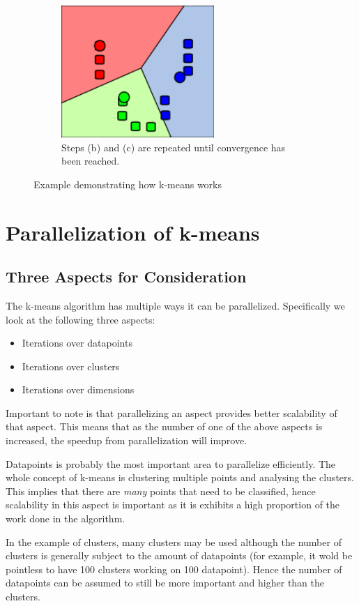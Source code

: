 \documentclass{article}
\begin{document}
\begin{figure}
    \begin{subfigure}{0.5\textwidth}
        \includegraphics[width=0.9\linewidth, height=5cm]{Pictures/K_Means_Example_Step_4.png}
        \caption{Steps (b) and (c) are repeated until convergence has been reached.}
    \end{subfigure}
\caption{Example demonstrating how k-means works}

\end{figure}



\section{Parallelization of k-means}
\subsection{Three Aspects for Consideration}
The k-means algorithm has multiple ways it can be parallelized. Specifically we look at the following three aspects:
\begin{itemize}
	\item Iterations over datapoints
	\item Iterations over clusters
	\item Iterations over dimensions
\end{itemize}

Important to note is that parallelizing an aspect provides better scalability of that aspect. This means that as the number of one of the above aspects is increased, the speedup from parallelization will improve.

Datapoints is probably the most important area to parallelize efficiently. The whole concept of k-means is clustering multiple points and analysing the clusters. This implies that there are \emph{many} points that need to be classified, hence scalability in this aspect is important as it is exhibits a high proportion of the work done in the algorithm.

In the example of clusters, many clusters may be used although the number of clusters is generally subject to the amount of datapoints (for example, it wold be pointless to have 100 clusters working on 100 datapoint). Hence the number of datapoints can be assumed to still be more important and higher than the clusters.
\end{document}
